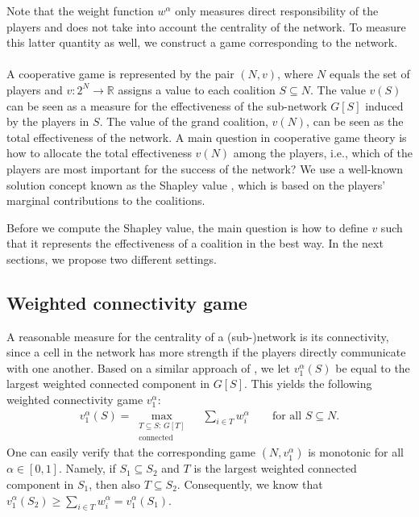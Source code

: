 \documentclass[10p]{article}
\theoremstyle{definition}
\theoremstyle{definition}
\begin{document}
Note that the weight function $w^\alpha$ only measures direct responsibility of the players and does not take into account the centrality of the network. To measure this latter quantity as well, we construct a game corresponding to the network.\\ \\
A cooperative game is represented by the pair $(N,v)$, where $N$ equals the set of players and $v : 2^N \rightarrow \mathbb{R}$ assigns a value to each coalition $S \subseteq N$. The value $v(S)$ can be seen as a measure for the effectiveness of the sub-network $G[S]$ induced by the players in $S$. The value of the grand coalition, $v(N)$, can be seen as the total effectiveness of the network. A main question in cooperative game theory is how to allocate the total effectiveness $v(N)$ among the players, i.e., which of the players are most important for the success of the network? We use a well-known solution concept known as the Shapley value \cite{shapley1953value}, which is based on the players' marginal contributions to the coalitions.

Before we compute the Shapley value, the main question is how to define $v$ such that it represents the effectiveness of a coalition in the best way. In the next sections, we propose two different settings.

\subsection{Weighted connectivity game}
A reasonable measure for the centrality of a (sub-)network is its connectivity, since a cell in the network has more strength if the players directly communicate with one another. Based on a similar approach of \cite{husslage2015ranking}, we let $v_1^\alpha(S)$ be equal to the largest weighted connected component in $G[S]$. This yields the following weighted connectivity game $v^\alpha_1$:
\begin{align*}
    v_1^\alpha(S) = \max_{\substack{T \subseteq S : \, G[T] \\ \text{connected}}}\quad \sum_{i \in T}w^\alpha_i \qquad \text{for all $S \subseteq N$.} 
\end{align*}
One can easily verify that the corresponding game $(N, v_1^\alpha)$ is monotonic for all $\alpha \in [0,1]$. Namely, if $S_1 \subseteq S_2$ and $T$ is the largest weighted connected component in $S_1$, then also $T \subseteq S_2$. Consequently, we know that $v_1^\alpha(S_2) \geq \sum_{i \in T}w^\alpha_i = v_1^\alpha(S_1)$.
\end{document}
